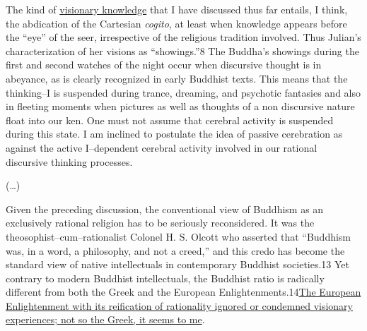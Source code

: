 \begin{myquote}
The kind of \underline{visionary knowledge} that I have discussed thus far entails, I think, the abdication of the Cartesian \textit{cogito}, at least when knowledge appears before the “eye” of the seer, irrespective of the religious tradition involved. Thus Julian’s characterization of her visions as “showings.”8 The Buddha’s showings during the first and second watches of the night occur when discursive thought is in abeyance, as is clearly recognized in early Buddhist texts. This means that the thinking–I is suspended during trance, dreaming, and psychotic fantasies and also in ﬂeeting moments when pictures as well as thoughts of a non discursive nature ﬂoat into our ken. One must not assume that cerebral activity is suspended during this state. I am inclined to postulate the idea of passive cerebration as against the active I–dependent cerebral activity involved in our rational discursive thinking processes.
\end{myquote}

\begin{myquote}
(…)
\end{myquote}

\begin{myquote}
Given the preceding discussion, the conventional view of Buddhism as an exclusively rational religion has to be seriously reconsidered. It was the theosophist–cum–rationalist Colonel H. S. Olcott who asserted that “Buddhism was, in a word, a philosophy, and not a creed,” and this credo has become the standard view of native intellectuals in contemporary Buddhist societies.13 Yet contrary to modern Buddhist intellectuals, the Buddhist ratio is radically diﬀerent from both the Greek and the European Enlightenments.14\underline{The European Enlightenment with its reification of rationality ignored or condemned visionary experiences; not so the Greek, it seems to me}.
\end{myquote}

